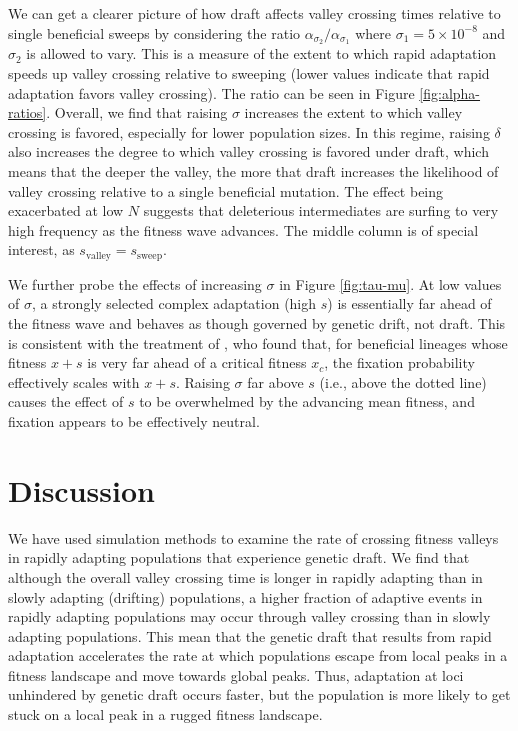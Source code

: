 \documentclass[10pt,twocolumn,twoside]{gsajnl}
\begin{document}
\begin{spacing}{1.5}
We can get a clearer picture of how draft affects valley crossing times relative to single beneficial sweeps by considering the ratio $\alpha_{\sigma_2} / \alpha_{\sigma_1}$ where $\sigma_1=5 \times 10^{-8}$ and $\sigma_2$ is allowed to vary.
This is a measure of the extent to which rapid adaptation speeds up valley crossing relative to sweeping (lower values indicate that rapid adaptation favors valley crossing).
The ratio can be seen in Figure \ref{fig:alpha-ratios}.
Overall, we find that raising $\sigma$ increases the extent to which valley crossing is favored, especially for lower population sizes.
In this regime, raising $\delta$ also increases the degree to which valley crossing is favored under draft, which means that the deeper the valley, the more that draft increases the likelihood of valley crossing relative to a single beneficial mutation.
The effect being exacerbated at low $N$ suggests that deleterious intermediates are surfing to very high frequency as the fitness wave advances.
The middle column is of special interest, as $s_{\mathrm{valley}} = s_{\mathrm{sweep}}$.

We further probe the effects of increasing $\sigma$ in Figure \ref{fig:tau-mu}.
At low values of $\sigma$, a strongly selected complex adaptation (high $s$) is essentially far ahead of the fitness wave and behaves as though governed by genetic drift, not draft.
This is consistent with the treatment of \citet{good_2012}, who found that, for beneficial lineages whose fitness $x + s$ is very far ahead of a critical fitness $x_c$, the fixation probability effectively scales with $x+s$.
Raising $\sigma$ far above $s$ (i.e., above the dotted line) causes the effect of $s$ to be overwhelmed by the advancing mean fitness, and fixation appears to be effectively neutral.

\section{Discussion}

We have used simulation methods to examine the rate of crossing fitness valleys in rapidly adapting populations that experience genetic draft.
We find that although the overall valley crossing time is longer in rapidly adapting than in slowly adapting (drifting) populations, a higher fraction of adaptive events in rapidly adapting populations may occur through valley crossing than in slowly adapting populations.
This mean that the genetic draft that results from rapid adaptation accelerates the rate at which populations escape from local peaks in a fitness landscape and move towards global peaks.
Thus, adaptation at loci unhindered by genetic draft occurs faster, but the population is more likely to get stuck on a local peak in a rugged fitness landscape.


\end{spacing}
\end{document}
